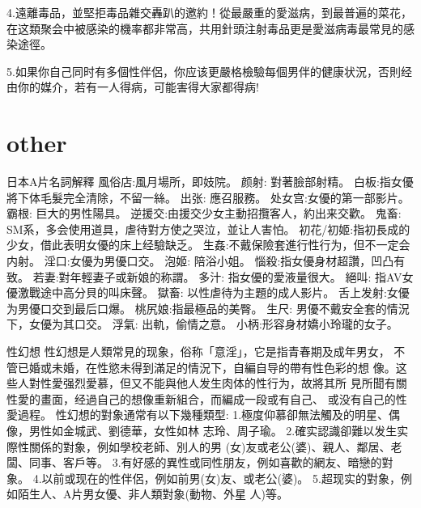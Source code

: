 \documentclass[12pt,UTF8]{ctexbook}
\begin{document}
4.遠離毒品，並堅拒毒品雜交轟趴的邀約！從最嚴重的愛滋病，到最普遍的菜花，在这類聚会中被感染的機率都非常高，共用針頭注射毒品更是愛滋病毒最常見的感染途徑。

5.如果你自己同时有多個性伴侶，你应该更嚴格檢驗每個男伴的健康状況，否則经由你的媒介，若有一人得病，可能害得大家都得病!

\part{other}

日本A片名詞解釋
風俗店:風月場所，即妓院。
颜射: 對著臉部射精。
白板:指女優將下体毛髮完全清除，不留一絲。
出张: 應召服務。
处女宫:女優的第一部影片。
霸根: 巨大的男性陽具。
逆援交:由援交少女主動招攬客人，約出来交歡。
鬼畜: SM系，多会使用道具，虐待對方使之哭泣，並让人害怕。
初花/初姬:指初長成的少女，借此表明女優的床上经驗缺乏。
生姦:不戴保險套進行性行为，但不一定会内射。
淫口:女優为男優口交。
泡姬: 陪浴小姐。
惱殺:指女優身材超讚，凹凸有致。
若妻:對年輕妻子或新娘的称謂。
多汁: 指女優的愛液量很大。
絕叫: 指AV女優激戰途中高分貝的叫床聲。
獄畜: 以性虐待为主題的成人影片。
舌上发射:女優为男優口交到最后口爆。
桃尻娘:指最極品的美臀。
生尺: 男優不戴安全套的情況下，女優为其口交。
浮氣: 出軌，偷情之意。
小柄:形容身材嬌小玲瓏的女子。

性幻想
性幻想是人類常見的现象，俗称「意淫」，它是指青春期及成年男女，
不管已婚或未婚，在性慾未得到滿足的情況下，自編自导的帶有性色彩的想
像。这些人對性愛强烈愛慕，但又不能與他人发生肉体的性行为，故將其所
見所聞有關性愛的畫面，经過自己的想像重新組合，而編成一段或有自己、
或没有自己的性愛過程。
性幻想的對象通常有以下幾種類型:
1.極度仰慕卻無法觸及的明星、偶像，男性如金城武、劉德華，女性如林
志玲、周子瑜。
2.確实認識卻難以发生实際性關係的對象，例如學校老師、別人的男
(女)友或老公(婆)、親人、鄰居、老闆、同事、客戶等。
3.有好感的異性或同性朋友，例如喜歡的網友、暗戀的對象。
4.以前或现在的性伴侶，例如前男(女)友、或老公(婆)。
5.超现实的對象，例如陌生人、A片男女優、非人類對象(動物、外星
人)等。
\end{document}
